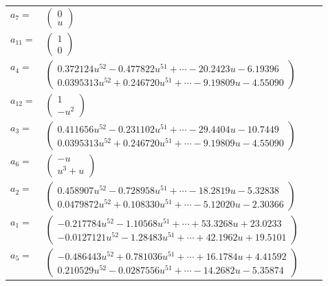 \documentclass[1p]{elsarticle_modified}
\theoremstyle{definition}
\begin{document}
\begin{tabular}{m{7pt} m{180pt} m{7pt} m{180pt} }
\flushright $a_{7}=$&$\begin{pmatrix}0\\u\end{pmatrix}$ \\
\flushright $a_{11}=$&$\begin{pmatrix}1\\0\end{pmatrix}$ \\
\flushright $a_{4}=$&$\begin{pmatrix}0.372124 u^{52}-0.477822 u^{51}+\cdots-20.2423 u-6.19396\\0.0395313 u^{52}+0.246720 u^{51}+\cdots-9.19809 u-4.55090\end{pmatrix}$ \\
\flushright $a_{12}=$&$\begin{pmatrix}1\\- u^2\end{pmatrix}$ \\
\flushright $a_{3}=$&$\begin{pmatrix}0.411656 u^{52}-0.231102 u^{51}+\cdots-29.4404 u-10.7449\\0.0395313 u^{52}+0.246720 u^{51}+\cdots-9.19809 u-4.55090\end{pmatrix}$ \\
\flushright $a_{6}=$&$\begin{pmatrix}- u\\u^3+u\end{pmatrix}$ \\
\flushright $a_{2}=$&$\begin{pmatrix}0.458907 u^{52}-0.728958 u^{51}+\cdots-18.2819 u-5.32838\\0.0479872 u^{52}+0.108330 u^{51}+\cdots-5.12020 u-2.30366\end{pmatrix}$ \\
\flushright $a_{1}=$&$\begin{pmatrix}-0.217784 u^{52}-1.10568 u^{51}+\cdots+53.3268 u+23.0233\\-0.0127121 u^{52}-1.28483 u^{51}+\cdots+42.1962 u+19.5101\end{pmatrix}$ \\
\flushright $a_{5}=$&$\begin{pmatrix}-0.486443 u^{52}+0.781036 u^{51}+\cdots+16.1784 u+4.41592\\0.210529 u^{52}-0.0287556 u^{51}+\cdots-14.2682 u-5.35874\end{pmatrix}$ \\

\end{tabular}
\end{document}
